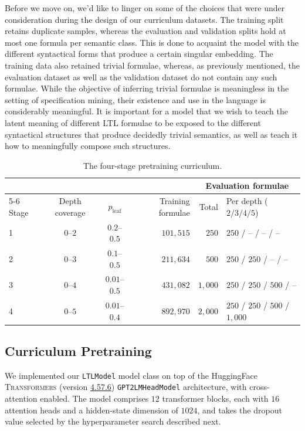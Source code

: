 \documentclass[titlepage,a4paper,11pt]{report}
\begin{document}
    Before we move on, we'd like to linger on some of the choices that were under consideration during the design of our curriculum datasets. The training split retains duplicate samples, whereas the evaluation and validation splits hold at most one formula per semantic class. This is done to acquaint the model with the different syntactical forms that produce a certain singular embedding. The training data also retained trivial formulae, whereas, as previously mentioned, the evaluation dataset as well as the validation dataset do not contain any such formulae. While the objective of inferring trivial formulae is meaningless in the setting of specification mining, their existence and use in the language is considerably meaningful. It is important for a model that we wish to teach the latent meaning of different LTL formulae to be exposed to the different syntactical structures that produce decidedly trivial semantics, as well as teach it how to meaningfully compose such structures.
    
    \begin{table}[ht]
        \centering
        \caption{The four-stage pretraining curriculum.}
        \label{tab:curriculum}
        \begin{tabular}{lccrrl}
            \toprule
            & & & & \multicolumn{2}{c}{Evaluation formulae} \\
            \cmidrule(lr){5-6}
            Stage & Depth coverage & $p_{\text{leaf}}$ & Training formulae & Total & Per depth ($2/3/4/5$) \\
            \midrule
            1 & $0$--$2$ & $0.2$--$0.5$   & $101{,}515$ & $250$     & $250$ / -- / -- / -- \\
            2 & $0$--$3$ & $0.1$--$0.5$   & $211{,}634$ & $500$     & $250$ / $250$ / -- / -- \\
            3 & $0$--$4$ & $0.01$--$0.5$  & $431{,}082$ & $1{,}000$ & $250$ / $250$ / $500$ / -- \\
            4 & $0$--$5$ & $0.01$--$0.4$  & $892{,}970$ & $2{,}000$ & $250$ / $250$ / $500$ / $1{,}000$ \\
            \bottomrule
        \end{tabular}
    \end{table}
    
    \subsection{Curriculum Pretraining}\label{sec:curriculum_pretraining}
    We implemented our \texttt{LTLModel} model class on top of the HuggingFace \textsc{Transformers} (version \href{https://github.com/huggingface/transformers/tree/v4.57.6}{4.57.6}) \texttt{GPT2LMHeadModel} architecture, with cross-attention enabled. The model comprises $12$ transformer blocks, each with $16$ attention heads and a hidden-state dimension of $1024$, and takes the dropout value selected by the hyperparameter search described next.
    
\end{document}
